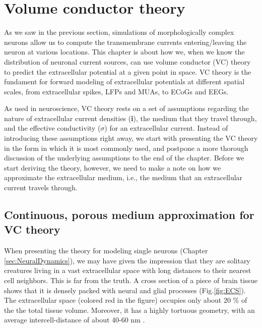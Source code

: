 \section{Volume conductor theory}
\label{sec:VC_theory}


As we saw in the previous section, simulations of morphologically complex neurons allow us to compute the transmembrane currents entering/leaving the neuron at various locations. This chapter is about how we, when we know the distribution of neuronal current sources, can use volume conductor (VC) theory to predict the extracellular potential at a given point in space. VC theory is the fundament for forward modeling of extracellular potentials at different spatial scales, from extracellular spikes, LFPs and MUAs, to ECoGs and EEGs.

As  used in neuroscience, VC theory rests on a set of assumptions regarding the nature of extracellular current densities ({\bf i}), the medium that they travel through, and the effective conductivity ($\sigma$) for an extracellular current. Instead of introducing these assumptions right away, we start with presenting the VC theory in the form in which it is most commonly used, and postpone a more thorough discussion of the underlying assumptions to the end of the chapter. Before we start deriving the theory, however, we need to make a note on how we approximate the extracellular medium, i.e., the medium that an extracellular current travels through.


\subsection{Continuous, porous medium approximation for VC theory}
\label{sec:continuous}
When presenting the theory for modeling single neurons (Chapter \ref{sec:NeuralDynamics}), we may have given the impression that they are solitary creatures living in a vast extracellular space with long distances to their nearest cell neighbors. This is far from the truth. A cross section of a piece of brain tissue shows that it is densely packed with neural and glial processes (Fig.\ref{fig:ECS}). The extracellular space (colored red in the figure) occupies only about 20 \% of the the total tissue volume. Moreover, it has a highly tortuous geometry, with an average intercell-distance of about 40-60 nm \citep{Sykova2008}. 

